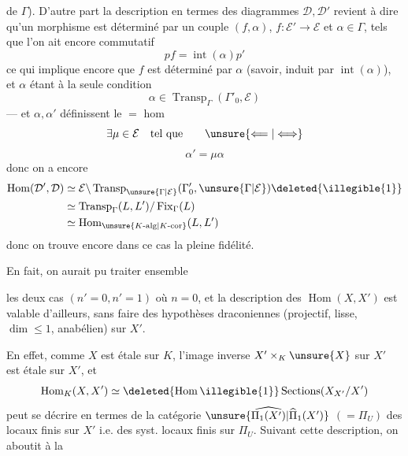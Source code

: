 de $\Gamma$).
D'autre part la description en termes des diagrammes $\mathcal D,\mathcal D'$ revient à dire qu'un morphisme est déterminé par un couple $(f,\alpha)$, $f:\mathcal E'\longrightarrow\mathcal E$ et $\alpha\in\Gamma$, tels que l'on ait encore commutatif
\[
pf=\operatorname{int}(\alpha)p'
\]
ce qui implique encore que $f$ est déterminé par $\alpha$ (savoir, induit par $\operatorname{int}(\alpha)$), et $\alpha$ étant  à la seule condition
\[
\alpha\in\operatorname{Transp}_{\Gamma}(\Gamma'_0,\mathcal E)
\]
--- et $\alpha,\alpha'$ définissent le $=$ hom 
\[
\exists\mu\in\mathcal E\quad\text{tel que}\qquad\unsure{\Longleftarrow|\Longleftrightarrow}
\]
\[
\alpha'=\mu\alpha
\]
donc on a encore
\[
\begin{aligned}
\operatorname{Hom}(\mathcal D',\mathcal D)
&\simeq\mathcal E\backslash\operatorname{Transp}_{\unsure{\Gamma|\mathcal E}}(\Gamma'_0,\unsure{\Gamma|\mathcal E})\deleted{\illegible{1}}\\
&\simeq\operatorname{Transp}_{\Gamma}(L,L')/\operatorname{Fix}_{\Gamma}(L)\\
&\simeq\operatorname{Hom}_{\unsure{K\text{-}\mathrm{alg}|K\text{-}\mathrm{cor}}}(L,L')
\end{aligned}
\]
donc on trouve encore dans ce cas la pleine fidélité.

En fait, on aurait pu traiter ensemble

les deux cas $(n'=0,n'=1)$ où $n=0$, et la description des $\operatorname{Hom}(X,X')$  est valable d'ailleurs, sans  faire des hypothèses draconiennes (projectif, lisse, $\dim\leq1$, anabélien) sur $X'$.

En effet, comme $X$ est  étale sur $K$, l'image inverse   $X'\times_K\unsure{X}$ sur $X'$ est  étale sur $X'$, et
\[
\operatorname{Hom}_K(X,X')\simeq\deleted{\operatorname{Hom}\illegible{1}}\operatorname{Sections}(X_{X'}/X')
\]
peut se décrire en termes de la catégorie $\unsure{\widehat{\Pi_1(X')}|\widehat{\Pi}_1(X')}$ $(=\Pi_U)$ des  locaux finis sur $X'$ i.e. des syst. locaux finis sur $\Pi_U$.
Suivant cette description, on aboutit à la


